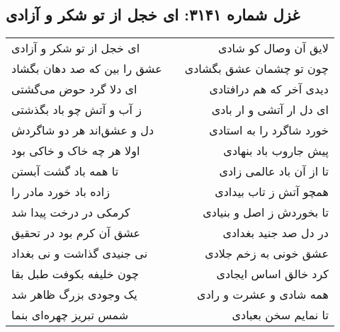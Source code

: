 \begin{center}
\section*{غزل شماره ۳۱۴۱: ای خجل از تو شکر و آزادی}
\label{sec:3141}
\begin{longtable}{l p{0.5cm} r}
ای خجل از تو شکر و آزادی
&&
لایق آن وصال کو شادی
\\
عشق را بین که صد دهان بگشاد
&&
چون تو چشمان عشق بگشادی
\\
ای دلا گرد حوض می‌گشتی
&&
دیدی آخر که هم درافتادی
\\
ز آب و آتش چو باد بگذشتی
&&
ای دل ار آتشی و ار بادی
\\
دل و عشق‌اند هر دو شاگردش
&&
خورد شاگرد را به استادی
\\
اولا هر چه خاک و خاکی بود
&&
پیش جاروب باد بنهادی
\\
تا همه باد گشت آبستن
&&
تا از آن باد عالمی زادی
\\
زاده باد خورد مادر را
&&
همچو آتش ز تاب بیدادی
\\
کرمکی در درخت پیدا شد
&&
تا بخوردش ز اصل و بنیادی
\\
عشق آن کرم بود در تحقیق
&&
در دل صد جنید بغدادی
\\
نی جنیدی گذاشت و نی بغداد
&&
عشق خونی به زخم جلادی
\\
چون خلیفه بکوفت طبل بقا
&&
کرد خالق اساس ایجادی
\\
یک وجودی بزرگ ظاهر شد
&&
همه شادی و عشرت و رادی
\\
شمس تبریز چهره‌ای بنما
&&
تا نمایم سخن بعبادی
\\
\end{longtable}
\end{center}

